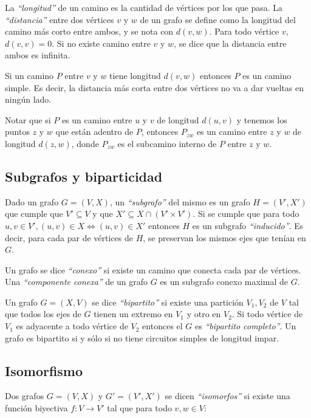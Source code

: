 La \emph{``longitud''} de un camino es la cantidad de v\'ertices por los que pasa. La \emph{``distancia''} entre dos v\'ertices $v$ y $w$ de un grafo se define como la longitud del camino m\'as corto entre ambos, y se nota con  $d(v,w)$. Para todo v\'ertice $v$, $d(v,v) = 0$. Si no existe camino entre $v$ y $w$, se dice que la distancia entre ambos es infinita.

Si un camino $P$ entre $v$ y $w$ tiene longitud $d(v, w)$ entonces $P$ es un camino simple. Es decir, la distancia m\'as corta entre dos v\'ertices no va a dar vueltas en ning\'un lado.

Notar que si $P$ es un camino entre $u$ y $v$ de longitud $d(u,v)$ y tenemos los puntos $z$ y $w$ que est\'an adentro de $P$, entonces $P_{zw}$ es un camino entre $z$ y $w$ de longitud $d(z,w)$, donde $P_{zw}$ es el subcamino interno de $P$ entre $z$ y $w$.

\subsection{Subgrafos y biparticidad}

Dado un grafo $G = (V,X)$, un \emph{``subgrafo''} del mismo es un grafo $H = (V',X')$ que cumple que $V' \subseteq V$ y que $X' \subseteq X \cap (V' \times V')$. Si se cumple que para todo $u,v \in V', (u,v) \in X \Longleftrightarrow (u,v) \in X'$ entonces $H$ es un subgrafo \emph{``inducido''}. Es decir, para cada par de v\'ertices de $H$, se preservan los mismos ejes que ten\'ian en $G$.


Un grafo se dice \emph{``conexo''} si existe un camino que conecta cada par de v\'ertices. Una \emph{``componente conexa''} de un grafo $G$ es un subgrafo conexo maximal de $G$.

Un grafo $G = (X, V)$ se dice \emph{``bipartito''} si existe una partici\'on $V_1,V_2$ de $V$ tal que todos los ejes de $G$ tienen un extremo en $V_1$ y otro en $V_2$. Si todo v\'ertice de $V_1$ es adyacente a todo v\'ertice de $V_2$ entonces el $G$ es \emph{``bipartito completo''}. Un grafo es bipartito si y s\'olo si no tiene circuitos simples de longitud impar.

\subsection{Isomorfismo}

Dos grafos $G = (V,X)$ y $G' = (V',X')$ se dicen \emph{``isomorfos''} si existe una funci\'on biyectiva $f:V\rightarrow V'$ tal que para todo $v,w \in V$:

